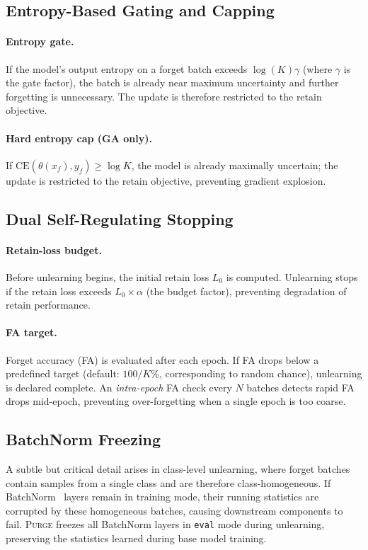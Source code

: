 \documentclass[10pt,twocolumn]{article}
\newcommand{\ours}{\textsc{Purge}}
\begin{document}
\subsection{Entropy-Based Gating and Capping}

\paragraph{Entropy gate.}
If the model's output entropy on a forget batch exceeds $\log(K)\gamma$ (where $\gamma$ is the gate factor), the batch is already near maximum uncertainty and further forgetting is unnecessary.
The update is therefore restricted to the retain objective.

\paragraph{Hard entropy cap (GA only).}
If $\text{CE}(\theta(x_f), y_f) \geq \log K$, the model is already maximally uncertain; the update is restricted to the retain objective, preventing gradient explosion.

\subsection{Dual Self-Regulating Stopping}

\paragraph{Retain-loss budget.}
Before unlearning begins, the initial retain loss $L_0$ is computed.
Unlearning stops if the retain loss exceeds $L_0 \times \alpha$ (the budget factor), preventing degradation of retain performance.

\paragraph{FA target.}
Forget accuracy (FA) is evaluated after each epoch.
If FA drops below a predefined target (default: $100/K$\%, corresponding to random chance), unlearning is declared complete.
An \emph{intra-epoch} FA check every $N$ batches detects rapid FA drops mid-epoch, preventing over-forgetting when a single epoch is too coarse.

\subsection{BatchNorm Freezing}

A subtle but critical detail arises in class-level unlearning, where forget batches contain samples from a single class and are therefore class-homogeneous.
If BatchNorm~\cite{ioffe2015batchnorm} layers remain in training mode, their running statistics are corrupted by these homogeneous batches, causing downstream components to fail.
\ours{} freezes all BatchNorm layers in \texttt{eval} mode during unlearning, preserving the statistics learned during base model training.
\end{document}
